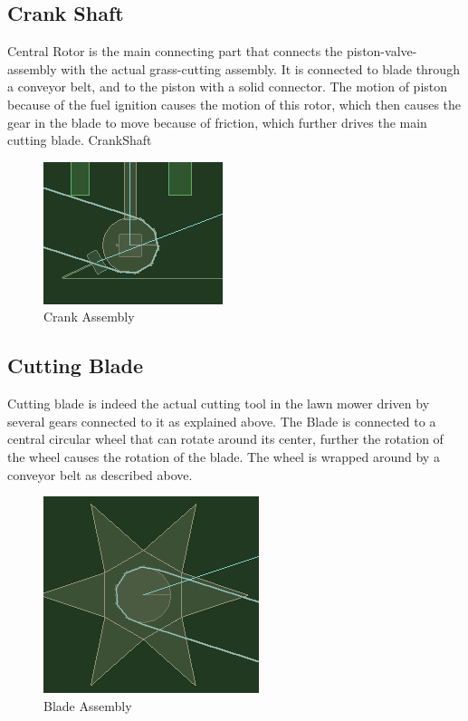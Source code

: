 \documentclass[12pt,a4paper]{report}
\begin{document}
\subsection*{Crank Shaft}

Central Rotor is the main connecting part that connects the piston-valve-assembly with the actual grass-cutting assembly. It is connected to blade through a conveyor belt, and to the piston with a solid connector. The motion of piston because of the fuel ignition causes the motion of this rotor, which then causes the gear in the blade to move because of friction, which further drives the main cutting blade. {CrankShaft}

\begin{figure}[ht!]
\centering
\includegraphics[scale=0.7]{crankShaft}
\caption{Crank Assembly}
\end{figure}

\subsection*{Cutting Blade}

Cutting blade is indeed the actual cutting tool in the lawn mower driven by several gears connected to it as explained above. The Blade is connected to a central circular wheel that can rotate around its center, further the rotation of the wheel causes the rotation of the blade. The wheel is wrapped around by a conveyor belt as described above.

\begin{figure}[ht!]
\centering
\includegraphics[scale=0.5]{bladeGear}
\caption{Blade Assembly}
\end{figure}
\pagebreak
\end{document}
